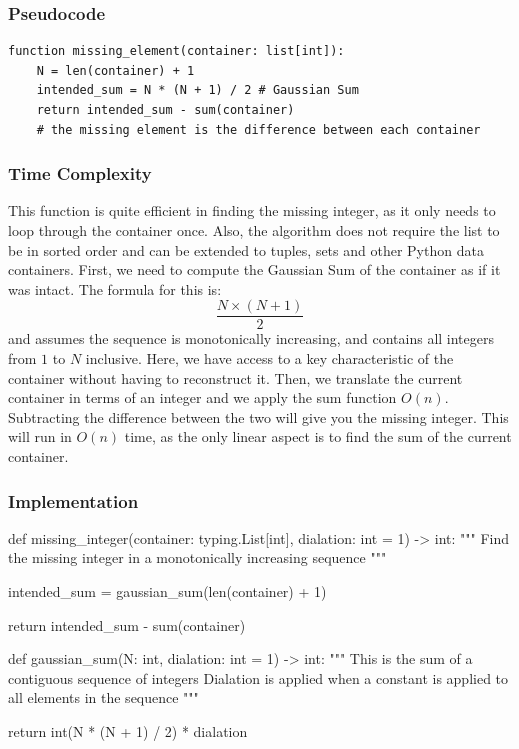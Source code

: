 \documentclass{article}
\begin{document}
\subsubsection{Pseudocode}

\begin{verbatim}
function missing_element(container: list[int]):
    N = len(container) + 1
    intended_sum = N * (N + 1) / 2 # Gaussian Sum
    return intended_sum - sum(container) 
    # the missing element is the difference between each container
\end{verbatim}


\subsubsection{Time Complexity}

This function is quite efficient in finding the missing integer, as it only needs to loop through the container once.
Also, the algorithm does not require the list to be in sorted order and can be extended to tuples, sets and other Python data containers.
First, we need to compute the Gaussian Sum of the container as if it was intact.
The formula for this is:
$$\frac{N \times (N + 1)}{2}$$
and assumes the sequence is monotonically increasing, and contains all integers from $1$ to $N$ inclusive.
Here, we have access to a key characteristic of the container without having to reconstruct it.
Then, we translate the current container in terms of an integer and we apply the sum function $O(n)$.
Subtracting the difference between the two will give you the missing integer.
This will  run in $O(n)$ time, as the only linear aspect is to find the sum of the current container.
\subsubsection{Implementation}

\begin{python}
def missing_integer(container: typing.List[int], dialation: int = 1) -> int:
    """
    Find the missing integer in a monotonically increasing sequence
    """

    intended_sum = gaussian_sum(len(container) + 1)

    return intended_sum - sum(container)


def gaussian_sum(N: int, dialation: int = 1) -> int:
    """
    This is the sum of a contiguous sequence of integers
    Dialation is applied when a constant is applied to all elements in the sequence
    """

    return int(N * (N + 1) / 2) * dialation
\end{python}
\end{document}

